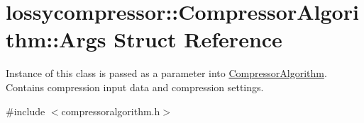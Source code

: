 \hypertarget{structlossycompressor_1_1_compressor_algorithm_1_1_args}{}\section{lossycompressor\+:\+:Compressor\+Algorithm\+:\+:Args Struct Reference}
\label{structlossycompressor_1_1_compressor_algorithm_1_1_args}


Instance of this class is passed as a parameter into \hyperlink{classlossycompressor_1_1_compressor_algorithm}{Compressor\+Algorithm}. Contains compression input data and compression settings.  




{\ttfamily \#include $<$compressoralgorithm.\+h$>$}

